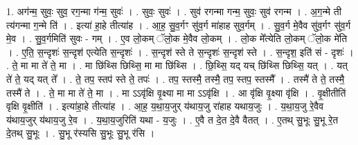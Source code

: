 \documentclass[17pt]{extarticle}
\begin{document}
1. अग॑न्म॒ सुवः॒ सुव॒ रग॒न्मा ग॑न्म॒ सुवः॑ । . सुवः॒ सुवः॑ । . सुव॑ रगन्मा गन्म॒ सुवः॒ सुव॑ रगन्म । . अ॒ग॒न्मे ती त्य॑गन्मा ग॒न्मे ति॑ । . इत्या॑ हा॒हे तीत्या॑ह । . आ॒ह॒ सु॒व॒र्गꣳ सु॑व॒र्ग मा॑हाह सुव॒र्गम् । . सु॒व॒र्ग मे॒वैव सु॑व॒र्गꣳ सु॑व॒र्ग मे॒व । . सु॒व॒र्गमिति॑ सुवः - गम् । . ए॒व लो॒कम् ॅलो॒क मे॒वैव लो॒कम् । . लो॒क मे᳚त्येति लो॒कम् ॅलो॒क मे॑ति । . ए॒ति॒ स॒न्दृशः॑ स॒न्दृश॑ एत्येति स॒न्दृशः॑ । . स॒न्दृश॑ स्ते ते स॒न्दृशः॑ स॒न्दृश॑ स्ते । . स॒न्दृश॒ इति॑ सं - दृशः॑ । . ते॒ मा मा ते॑ ते॒ मा । . मा छि॑थ्सि छिथ्सि॒ मा मा छि॑थ्सि । . छि॒थ्सि॒ यद् यच् छि॑थ्सि छिथ्सि॒ यत् । . यत् ते॑ ते॒ यद् यत् ते᳚ । . ते॒ तप॒ स्तप॑ स्ते ते॒ तपः॑ । . तप॒ स्तस्मै॒ तस्मै॒ तप॒ स्तप॒ स्तस्मै᳚ । . तस्मै॑ ते ते॒ तस्मै॒ तस्मै॑ ते । . ते॒ मा मा ते॑ ते॒ मा । . मा ऽऽवृ॑क्षि वृ॒क्ष्या मा मा ऽऽवृ॑क्षि । . आ वृ॑क्षि वृ॒क्ष्या वृ॑क्षि । . वृ॒क्षीतीति॑ वृक्षि वृ॒क्षीति॑ । . इत्या॑हा॒हे तीत्या॑ह । . आ॒ह॒ य॒था॒य॒जुर् य॑थाय॒जु रा॑हाह यथाय॒जुः । . य॒था॒य॒जु रे॒वैव य॑थाय॒जुर् य॑थाय॒जु रे॒व । . य॒था॒य॒जुरिति॑ यथा - य॒जुः । . ए॒वै त दे॒त दे॒वै वैतत् । . ए॒तथ् सु॒भूः सु॒भू रे॒त दे॒तथ् सु॒भूः । . सु॒भू र॑स्यसि सु॒भूः सु॒भू र॑सि । \newline
\end{document}

